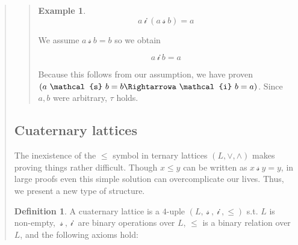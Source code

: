 \documentclass[a4paper, 12pt]{article}
\theoremstyle{definition}
\theoremstyle{definition}
\newtheorem{example}{Example}
\theoremstyle{definition}
\newtheorem{definition}{Definition}
\begin{document}
\begin{quote}
\begin{quote}
\begin{example}
    \begin{equation*}
        a ~\mathcal{i}~(a ~\mathcal{s}~b) = a
    \end{equation*}

    We assume $a ~\mathcal{s}~b = b$ so we obtain 

    \begin{equation*}
        a ~\mathcal{i}~b = a
    \end{equation*}

    Because this follows from our assumption, we have proven $(a ~\mathcal{s}~b
    = b \Rightarrowa ~\mathcal{i}~b = a)$. Since $a, b$ were arbitrary, $\tau$
    holds.
\end{example}

\end{quote}
\normalsize

\subsection{Cuaternary lattices}

The inexistence of the $\leq$ symbol in ternary lattices $(L, \lor, \land)$ makes proving 
things rather difficult. Though $x \leq y$ can be written as $x ~\mathcal{s}~ y = y$,
in large proofs even this simple solution can overcomplicate our lives. Thus, 
we present a new type of structure. 

\begin{definition}
    A cuaternary lattice is a $4$-uple $(L, ~\mathcal{s}~, ~\mathcal{i}~, \leq)$ s.t. $L$ is non-empty,
    $~\mathcal{s}~, ~\mathcal{i}~$ are binary operations over $L$, $\leq$ is a binary 
    relation over $L$, and the following axioms hold:


\end{definition}
\end{quote}
\end{document}
